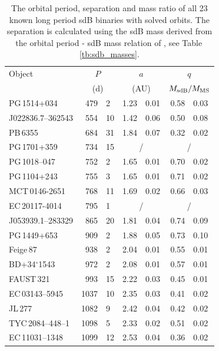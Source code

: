 \begin{table}
 \centering
   \caption{The orbital period, separation and mass ratio of all 23 known long period sdB binaries with solved orbits. The separation is calculated using the sdB mass derived from the orbital period - sdB mass relation of \citet{Chen2013}, see Table\,\ref{tb:sdb_masses}.} \label{tb:p_q_summary}
   \begin{tabular}{lr@{ $\pm$ }lr@{ $\pm$ }lr@{ $\pm$ }l}
   \hline\hline
   Object   &   \multicolumn{2}{c}{$P$} &    \multicolumn{2}{c}{$a$} &   \multicolumn{2}{c}{$q$} \\
            &   \multicolumn{2}{c}{(d)} &    \multicolumn{2}{c}{(AU)} &   \multicolumn{2}{c}{$M_{\rm sdB} / M_{\rm MS}$} \\\hline
   PG\,1514+034            &  479 &  2 & 1.23 & 0.01 & 0.58 & 0.03 \\
   J022836.7--362543       &  554 & 10 & 1.42 & 0.06 & 0.50 & 0.08 \\
   PB\,6355                &  684 & 31 & 1.84 & 0.07 & 0.32 & 0.02 \\
   PG\,1701+359            &  734 & 15 & \multicolumn{2}{c}{/} & \multicolumn{2}{c}{/} \\
   PG\,1018--047           &  752 &  2 & 1.65 & 0.01 & 0.70 & 0.02 \\
   PG\,1104+243            &  755 &  3 & 1.65 & 0.01 & 0.71 & 0.02 \\
   MCT\,0146-2651          &  768 & 11 & 1.69 & 0.02 & 0.66 & 0.03 \\
   EC\,20117-4014          &  795 &  1 & \multicolumn{2}{c}{/} & \multicolumn{2}{c}{/} \\
   J053939.1--283329       &  865 & 20 & 1.81 & 0.04 & 0.74 & 0.09 \\
   PG\,1449+653            &  909 &  2 & 1.88 & 0.05 & 0.73 & 0.10 \\
   Feige\,87               &  938 &  2 & 2.04 & 0.01 & 0.55 & 0.01 \\
   BD+34$^{\circ}$1543     &  972 &  2 & 2.08 & 0.01 & 0.57 & 0.01 \\
   FAUST\,321              &  993 & 15 & 2.22 & 0.03 & 0.45 & 0.01 \\
   EC\,03143--5945         & 1037 & 10 & 2.35 & 0.03 & 0.41 & 0.02 \\
   JL\,277                 & 1082 &  9 & 2.42 & 0.04 & 0.42 & 0.02 \\
   TYC\,2084--448--1       & 1098 &  5 & 2.33 & 0.02 & 0.51 & 0.02 \\
   EC\,11031--1348         & 1099 & 12 & 2.53 & 0.04 & 0.36 & 0.02 \\

\end{tabular}
\end{table}

